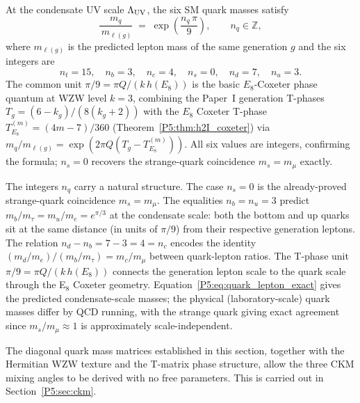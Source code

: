 \begin{theorem}
\label{P5:thm:quark_lepton_ratios}
At the condensate UV scale $\Lambda_{\mathrm{UV}}$, the six SM quark masses satisfy
\begin{equation}
  \frac{m_q}{\,m_{\ell(g)}} \;=\; \exp\!\left(\frac{n_q\,\pi}{9}\right),
  \qquad n_q \in \mathbb{Z},
  \label{P5:eq:quark_lepton_exact}
\end{equation}
where $m_{\ell(g)}$ is the predicted lepton mass of the same generation
$g$ and the six integers are
\begin{equation}
  n_t = 15,\quad n_b = 3,\quad n_c = 4,\quad n_s = 0,\quad n_d = 7,\quad n_u = 3.
  \label{P5:eq:nq_values}
\end{equation}
The common unit $\pi/9=\pi Q/(k\,h(E_8))$ is the basic $E_8$-Coxeter
phase quantum at WZW level $k=3$, combining the Paper~I generation
T-phases $T_g=(6-k_g)/(8(k_g+2))$ with the $E_8$ Coxeter T-phase
$T^{(m)}_{E_8}=(4m-7)/360$ (Theorem~\ref{P5:thm:h2I_coxeter}) via
$m_q/m_{\ell(g)}=\exp(2\pi Q(T_g-T^{(m)}_{E_8}))$. All six values are
integers, confirming the formula; $n_s=0$ recovers the strange-quark
coincidence $m_s=m_\mu$ exactly.
\end{theorem}

\begin{remark}
\label{P5:rem:nq_structure}
The integers $n_q$ carry a natural structure.
The case $n_s = 0$ is the already-proved strange-quark coincidence $m_s = m_\mu$.
The equalities $n_b = n_u = 3$ predict $m_b/m_\tau = m_u/m_e = e^{\pi/3}$
at the condensate scale: both the bottom and up quarks sit at the same distance
(in units of $\pi/9$) from their respective generation leptons.
The relation $n_d - n_b = 7-3 = 4 = n_c$ encodes the identity
$(m_d/m_e)/(m_b/m_\tau) = m_c/m_\mu$ between quark-lepton ratios.
The T-phase unit $\pi/9 = \pi Q/(k\,h(E_8))$ connects the generation
lepton scale to the quark scale through the E$_8$ Coxeter geometry.
Equation~\eqref{P5:eq:quark_lepton_exact} gives the predicted condensate-scale
masses; the physical (laboratory-scale) quark masses differ by QCD running,
with the strange quark giving exact agreement since $m_s/m_\mu \approx 1$
is approximately scale-independent.
\end{remark}

\begin{remark}
\label{P5:rem:ckm_preview}
The diagonal quark mass matrices established in this section,
together with the Hermitian WZW texture and the T-matrix phase structure,
allow the three CKM mixing angles to be derived with no free parameters.
This is carried out in Section~\ref{P5:sec:ckm}.
\end{remark}

